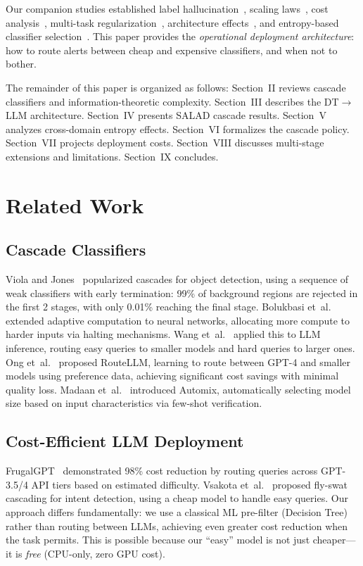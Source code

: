 \documentclass[review,3p]{elsarticle}
\begin{document}
Our companion studies established label hallucination~\cite{p3}, scaling laws~\cite{p6}, cost analysis~\cite{p7}, multi-task regularization~\cite{p15}, architecture effects~\cite{p21}, and entropy-based classifier selection~\cite{p8}. This paper provides the \emph{operational deployment architecture}: how to route alerts between cheap and expensive classifiers, and when not to bother.

The remainder of this paper is organized as follows: Section~II reviews cascade classifiers and information-theoretic complexity. Section~III describes the DT$\to$LLM architecture. Section~IV presents SALAD cascade results. Section~V analyzes cross-domain entropy effects. Section~VI formalizes the cascade policy. Section~VII projects deployment costs. Section~VIII discusses multi-stage extensions and limitations. Section~IX concludes.

\section{Related Work}

\subsection{Cascade Classifiers}
Viola and Jones~\cite{viola2001} popularized cascades for object detection, using a sequence of weak classifiers with early termination: 99\% of background regions are rejected in the first 2 stages, with only 0.01\% reaching the final stage. Bolukbasi et~al.~\cite{bolukbasi2017} extended adaptive computation to neural networks, allocating more compute to harder inputs via halting mechanisms. Wang et~al.~\cite{wang2023} applied this to LLM inference, routing easy queries to smaller models and hard queries to larger ones. Ong et~al.~\cite{ong2024} proposed RouteLLM, learning to route between GPT-4 and smaller models using preference data, achieving significant cost savings with minimal quality loss. Madaan et~al.~\cite{madaan2024} introduced Automix, automatically selecting model size based on input characteristics via few-shot verification.

\subsection{Cost-Efficient LLM Deployment}
FrugalGPT~\cite{chen2023} demonstrated 98\% cost reduction by routing queries across GPT-3.5/4 API tiers based on estimated difficulty. Vsakota et~al.~\cite{vsakota2024} proposed fly-swat cascading for intent detection, using a cheap model to handle easy queries. Our approach differs fundamentally: we use a classical ML pre-filter (Decision Tree) rather than routing between LLMs, achieving even greater cost reduction when the task permits. This is possible because our ``easy'' model is not just cheaper---it is \emph{free} (CPU-only, zero GPU cost).
\end{document}
